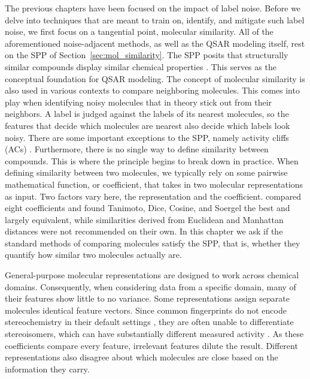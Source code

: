 The previous chapters have been focused on the impact of label noise. Before we delve into techniques that are meant to train on, identify, and mitigate such label noise, we first focus on a tangential point, molecular similarity. All of the aforementioned noise-adjacent methods, as well as the QSAR modeling itself, rest on the SPP of Section~\ref{sec:mol_similarity}. The SPP posits that structurally similar compounds display similar chemical properties \citep{Johnson1990}. This serves as the conceptual foundation for QSAR modeling. The concept of molecular similarity is also used in various contexts to compare neighboring molecules. This comes into play when identifying noisy molecules that in theory stick out from their neighbors. A label is judged against the labels of its nearest molecules, so the features that decide which molecules are nearest also decide which labels look noisy. There are some important exceptions to the SPP, namely activity cliffs (ACs) \citep{Stumpfe2012, vanTilborg2022}. Furthermore, there is no single way to define similarity between compounds. This is where the principle begins to break down in practice. When defining similarity between two molecules, we typically rely on some pairwise mathematical function, or coefficient, that takes in two molecular representations as input. Two factors vary here, the representation and the coefficient. \citet{Bajusz2015} compared eight coefficients and found Tanimoto, Dice, Cosine, and Soergel the best and largely equivalent, while similarities derived from Euclidean and Manhattan distances were not recommended on their own. In this chapter we ask if the standard methods of comparing molecules satisfy the SPP, that is, whether they quantify how similar two molecules actually are.

General-purpose molecular representations are designed to work across chemical domains. Consequently, when considering data from a specific domain, many of their features show little to no variance. Some representations assign separate molecules identical feature vectors. Since common fingerprints do not encode stereochemistry in their default settings \citep{orsi2024map4c}, they are often unable to differentiate stereoisomers, which can have substantially different measured activity \citep{Nguyen2006}. As these coefficients compare every feature, irrelevant features dilute the result. Different representations also disagree about which molecules are close based on the information they carry. 

